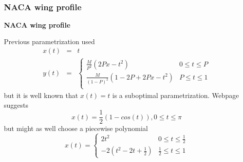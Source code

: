 \documentclass{beamer}
\theoremstyle{plain}
\theoremstyle{definition}
\begin{document}

\begin{frame}
\frametitle{NACA wing profile}
\textbf{NACA wing profile}

Previous parametrization used
\begin{eqnarray*}
    x(t) & = & t \\
    y(t) & = & \left\{
    \begin{array}{ll}
        \frac{M}{P^2}(2Px-t^2)          & 0\leq t\leq P \\
        \frac{M}{(1-P)^2}(1-2P+2Px-t^2) & P\leq t\leq 1 \\
    \end{array} \right.
\end{eqnarray*}
\pause
but it is well known that $x(t)=t$ is a suboptimal parametrization.
Webpage suggests
\begin{equation*}
    x(t) = \frac{1}{2}\left(1-cos(t)\right), 0\leq t\leq \pi
\end{equation*}
\pause
but might as well choose a piecewise polynomial
\begin{equation*}
    x(t) = \left\{
        \begin{array}{ll}
             2t^2                  & 0 \leq t \leq \frac{1}{2} \\
            -2(t^2-2t+\frac{1}{2}) & \frac{1}{2} \leq t \leq 1
        \end{array}
    \right.
\end{equation*}

\end{frame}

\end{document}
